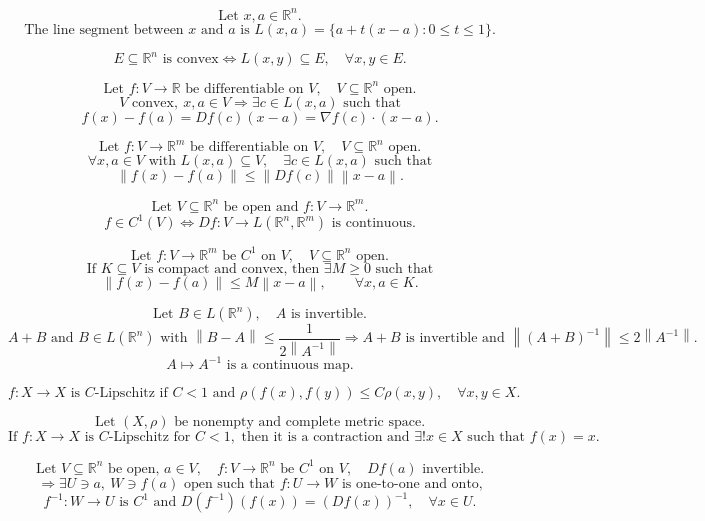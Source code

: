\documentclass[11pt]{article}
\newcommand{\R}{\mathbb R}
\newcommand{\norm}[1]{\left\lVert #1\right\rVert}
\begin{document}
\[
\text{Let }x,a\in\R^n.
\]
\[
\text{The line segment between }x\text{ and }a\text{ is }
L(x,a)=\{a+t(x-a):0\le t\le1\}.
\]

\[
E\subseteq\R^n\text{ is convex}
\Longleftrightarrow
L(x,y)\subseteq E,\quad \forall x,y\in E.
\]

\[
\text{Let }f:V\to\R\text{ be differentiable on }V,\quad V\subseteq\R^n\text{ open.}
\]
\[
V\text{ convex},\ x,a\in V
\Longrightarrow
\exists c\in L(x,a)\text{ such that}
\]
\[
f(x)-f(a)=Df(c)(x-a)=\nabla f(c)\cdot(x-a).
\]

\[
\text{Let }f:V\to\R^m\text{ be differentiable on }V,\quad V\subseteq\R^n\text{ open.}
\]
\[
\forall x,a\in V\text{ with }L(x,a)\subseteq V,\quad
\exists c\in L(x,a)\text{ such that}
\]
\[
\norm{f(x)-f(a)}\le\norm{Df(c)}\norm{x-a}.
\]

\[
\text{Let }V\subseteq\R^n\text{ be open and }f:V\to\R^m.
\]
\[
f\in C^1(V)
\Longleftrightarrow
Df:V\to L(\R^n,\R^m)\text{ is continuous.}
\]

\[
\text{Let }f:V\to\R^m\text{ be }C^1\text{ on }V,\quad V\subseteq\R^n\text{ open.}
\]
\[
\text{If }K\subseteq V\text{ is compact and convex, then }
\exists M\ge0\text{ such that}
\]
\[
\norm{f(x)-f(a)}\le M\norm{x-a},\qquad \forall x,a\in K.
\]

\newpage


\[
\text{Let }B\in L(\R^n),\quad A\text{ is invertible.}
\]
\[
A+B\text{ and }B\in L(\R^n)\text{ with }\norm{B-A}\le\frac1{2\norm{A^{-1}}}
\Longrightarrow A+B\text{ is invertible and }\norm{(A+B)^{-1}}\le2\norm{A^{-1}}.
\]
\[
A\mapsto A^{-1}\text{ is a continuous map.}
\]

\[
f:X\to X\text{ is }C\text{-Lipschitz if }C<1
\text{ and }\rho(f(x),f(y))\le C\rho(x,y),\quad \forall x,y\in X.
\]

\[
\text{Let }(X,\rho)\text{ be nonempty and complete metric space.}
\]
\[
\text{If }f:X\to X\text{ is }C\text{-Lipschitz for }C<1,
\text{ then it is a contraction and }\exists!x\in X\text{ such that }f(x)=x.
\]

\[
\text{Let }V\subseteq\R^n\text{ be open, }a\in V,\quad f:V\to\R^n
\text{ be }C^1\text{ on }V,\quad Df(a)\text{ invertible.}
\]
\[
\Longrightarrow
\exists U\ni a,\ W\ni f(a)\text{ open such that }f:U\to W\text{ is one-to-one and onto,}
\]
\[
f^{-1}:W\to U\text{ is }C^1\text{ and }
D(f^{-1})(f(x))=(Df(x))^{-1},\quad \forall x\in U.
\]
\end{document}
